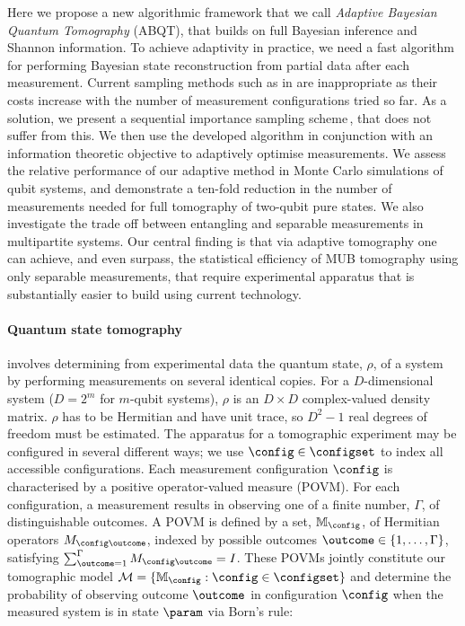 Here we propose a new algorithmic framework that we call \emph{Adaptive Bayesian Quantum Tomography} (ABQT), that builds on full Bayesian inference and Shannon information. 
To achieve adaptivity in practice, we need a fast algorithm for performing Bayesian state reconstruction from partial data after each measurement. Current sampling methods such as in \citep{BayesianTomography} are inappropriate as their costs increase with the number of measurement configurations tried so far. As a solution, we present a sequential importance sampling scheme\,\citep{SMCBook}, that does not suffer from this. We then use the developed algorithm in conjunction with an information theoretic objective to adaptively optimise measurements. We assess the relative performance of our adaptive method in Monte Carlo simulations of qubit systems, and demonstrate a ten-fold reduction in the number of measurements needed for full tomography of two-qubit pure states. We also investigate the trade off between entangling and separable measurements in multipartite systems. Our central finding is that via adaptive tomography one can achieve, and even surpass, the statistical efficiency of MUB tomography using only separable measurements, that require experimental apparatus that is substantially easier to build using current technology.

\paragraph{Quantum state tomography} involves determining from experimental data the quantum state, $\rho$, of a system by performing measurements on several identical copies. For a $D$-dimensional system ($D=2^m$ for $m$-qubit systems), $\rho$ is an $D \times D$ complex-valued density matrix. $\rho$ has to be Hermitian and have unit trace, so $D^2-1$ real degrees of freedom must be estimated. The apparatus for a tomographic experiment may be configured in several different ways; we use $\config\in\configset$ to index all accessible configurations. Each measurement configuration $\config$ is characterised by a positive operator-valued measure (POVM). For each configuration, a measurement results in observing one of a finite number, $\Gamma$, of distinguishable outcomes. A POVM is defined by a set, $\mathbb{M}_{\config}$, of Hermitian operators $M_{\config\outcome}$, indexed by possible outcomes $\outcome\in\{1,\ldots,\Gamma\}$, satisfying $\sum_{\outcome=1}^{\Gamma} M_{\config\outcome} = I$. These POVMs jointly constitute our tomographic model $\mathcal{M}=\{\mathbb{M}_{\config}:\config\in\configset\}$ and determine the probability of observing outcome $\outcome$ in configuration $\config$ when the measured system is in state $\param$ via Born's rule:

